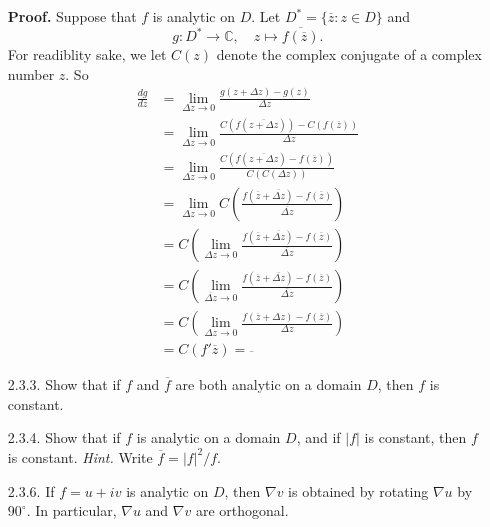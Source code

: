 \documentclass[9pt]{article}
\newcommand{\C}{\mathbb{C}}
\begin{document}
\begin{enumerate}
      \textbf{Proof.} Suppose that $f$ is analytic on $D$. Let
      $D^* = \{\overline{z} : z \in D\}$ and
      $$g : D^* \rightarrow \C, \quad z \mapsto\overline{f(\overline{z})}.$$
      For readiblity sake, we let $C(z)$ denote the complex conjugate of a
      complex number $z$. So
      \begin{align*}
         \frac{dg}{dz} &= \lim_{\Delta z \rightarrow 0}
            \frac{g(z + \Delta z) - g(z)}{\Delta z} \\
            &= \lim_{\Delta z \rightarrow 0}
            \frac{C(f(\overline{z + \Delta z})) -
               C(f(\overline{z}))}{\Delta z} \\
            &= \lim_{\Delta z \rightarrow 0}
            \frac{C(f(\overline{z + \Delta z}) -
               f(\overline{z}))}{C(C(\Delta z))} \\
            &= \lim_{\Delta z \rightarrow 0}
            C\left(\frac{f(\overline{z} + \overline{\Delta z}) -
               f(\overline{z})}{\overline{\Delta z}}\right) \\
            &= C\left(\lim_{\Delta z \rightarrow 0}
            \frac{f(\overline{z} + \overline{\Delta z}) -
               f(\overline{z})}{\overline{\Delta z}}\right) \\
            &= C\left(\lim_{\overline{\Delta z} \rightarrow 0}
            \frac{f(\overline{z} + \overline{\Delta z}) -
               f(\overline{z})}{\overline{\Delta z}}\right) \\
            &= C\left(\lim_{\Delta z \rightarrow 0}
            \frac{f(\overline{z} + \Delta z) -
               f(\overline{z})}{\Delta z}\right) \\
            &= C(f'\overline{z}) = \overline{}
      \end{align*}
   \item[2.3.3.]  Show that if $f$ and $\overline{f}$ are both analytic on a
                  domain $D$, then $f$ is constant.
   \item[2.3.4.]  Show that if $f$ is analytic on a domain $D$, and if $|f|$ is
                  constant, then $f$ is constant. \textit{Hint.} Write
                  $\overline{f} = |f|^2/f$.
   \item[2.3.6.]  If $f = u + iv$ is analytic on $D$, then $\nabla v$ is
                  obtained by rotating $\nabla u$ by $90^\circ$. In particular,
                  $\nabla u$ and $\nabla v$ are orthogonal.
\end{enumerate}
\end{document}
